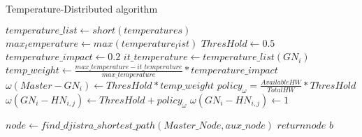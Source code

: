 \begin{algorithm}
    \caption{Temperature-Distributed algorithm}
    \begin{algorithmic}[1]
    {
        \State $temperature\_list\gets short(temperatures)$
        \State $max_temperature\gets max(temperature_list)$
        \State $ThresHold\gets 0.5$
        \State $temperature\_impact \gets 0.2$
        \State $it\_temperature \gets temperature\_list(GN_i)$
        \State $temp\_weight \gets \frac{max\_temperature-it\_temperature}{max\_temperature}*temperature\_impact$
        \State $\omega(Master-GN_i) \gets ThresHold*temp\_weight$
            \State $policy_\omega = \frac{Available HW}{Total HW}*ThresHold$
            \State $\omega(GN_i-HN_{i,j}) \gets ThresHold+policy_\omega$
        \Else
            \State $\omega(GN_i - HN_{i,j}) \gets 1$
        \EndIf

        \EndFor
        \EndFor
        \State $node \gets find\_djistra\_shortest\_path(Master\_Node, aux\_node)$
        \State \textbf{$return node$} $b$
        \EndProcedure
    }
    \end{algorithmic}
\end{algorithm}